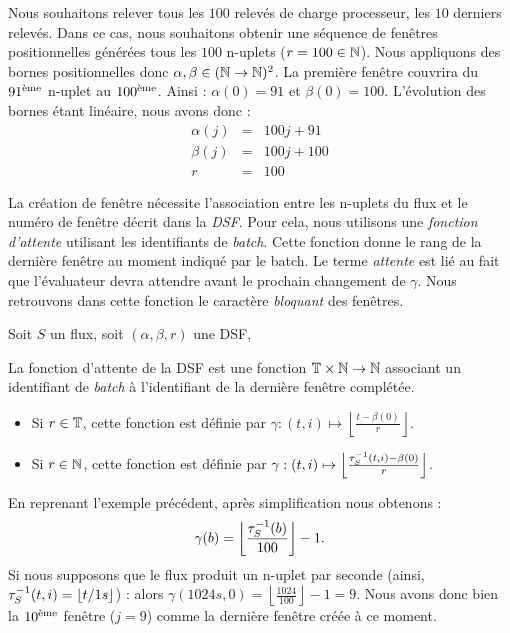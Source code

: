 \begin{example}
    Nous souhaitons relever tous les $100$ relevés de charge processeur, les $10$ derniers relevés. Dans ce cas, nous souhaitons obtenir une séquence de fenêtres positionnelles générées tous les $100$ n-uplets ($r=100\in \mathbb{N}$). Nous appliquons des bornes positionnelles donc $\alpha,\beta \in (\mathbb{N}\to\mathbb{N})^2$. La première fenêtre couvrira du $91^{\textrm{\`{e}me}}$ n-uplet au $100^{\textrm{\`{e}me}}$. Ainsi : $\alpha(0) = 91$ et $\beta(0) = 100$. L'évolution des bornes étant linéaire, nous avons donc :
\begin{eqnarray*}
 \alpha(j) &=& 100j+91\\
 \beta(j) &=& 100j + 100\\
 r & = & 100
\end{eqnarray*}
\end{example}

La création de fenêtre nécessite l'association entre les n-uplets du flux et le numéro de fenêtre décrit dans la \textit{DSF}. Pour cela, nous utilisons une \textit{fonction d'attente} utilisant les identifiants de \textit{batch}. Cette fonction donne le rang de la dernière fenêtre au moment indiqué par le batch. Le terme \textit{attente} est lié au fait que l'évaluateur devra attendre avant le prochain changement de $\gamma$.
Nous retrouvons dans cette fonction le caractère \textit{bloquant} des fenêtres.
\begin{defi}
    Soit $S$ un flux, soit $(\alpha,\beta,r)$ une DSF,

    La fonction d'attente de la DSF est une fonction $\mathbb{T}\times\mathbb{N} \to \mathbb{N}$ associant un identifiant de \textit{batch} à l'identifiant de la dernière fenêtre complétée.
\begin{itemize}
 \item  Si $r\in\mathbb{T}$, cette fonction est définie par $\gamma : (t,i) \mapsto \left\lfloor \frac{t-\beta(0)}{r} \right\rfloor$.
 \item  Si $r\in\mathbb{N}$, cette fonction est définie par $\gamma : (t,i) \mapsto \left\lfloor \frac{\tau^{-1}_S(t,i)-\beta(0)}{r} \right\rfloor$.
\end{itemize}
\end{defi}
\begin{example}
    En reprenant l'exemple précédent, après simplification nous obtenons : $$\gamma(b) = \left\lfloor \frac{\tau^{-1}_S(b)}{100}\right\rfloor-1.$$
    Si nous supposons que le flux produit un n-uplet par seconde (ainsi, $\tau^{-1}_S(t,i) = \lfloor t/1s \rfloor$) : alors $\gamma(1024s,0) = \left\lfloor \frac{1024}{100}\right\rfloor-1 = 9$. Nous avons donc bien la $10^{\textrm{\`{e}me}}$ fenêtre ($j=9$) comme la dernière fenêtre créée à ce moment.
\end{example}

